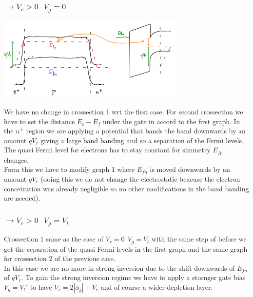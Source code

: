 \subsubsection{$\rightarrow V_r>0 \ \ \ V_g=0$}

\centering
\includegraphics[width=0.7\textwidth]{b1.png}\\
\raggedright

We have no change in crossection 1 wrt the first case.
For second crossection we have to set the distance $E_c-E_f$ under the gate in accord to the first graph. In the $n^+$ region we are applying a potential that bands the band downwards by an amount $qV_r$ giving a large band banding and so a separation of the Fermi levels.\\
The quasi Fermi level for electrons has to stay constant for simmetry $E_{fp}$ changes.\\
Form this we have to modify graph 1 where $E_{fn}$ is moved downwards by an amount $qV_r$ (doing this we do not change the electrostatic beacuse the electron concetration was already negligible so no other modifications in the band banding are needed).\\

\subsubsection{$\rightarrow V_r>0 \ \ \  V_g=V_t$}
Crossection 1 same as the case of $V_r=0 \ \ V_g=V_t$ with the same step of before we get the separation of the quasi Fermi levels in the first graph and the same graph for crossection 2 of the previous case.\\
In this case we are no more in strong inversion due to the shift downwards of $E_{fn}$ of $qV_r$. To gain the strong inversion regime we have to apply a stornger gate bias $V_g=V_t'$ to have $V_s=2|\phi_b|+V_r$ and of course a wider depletion layer.\\


